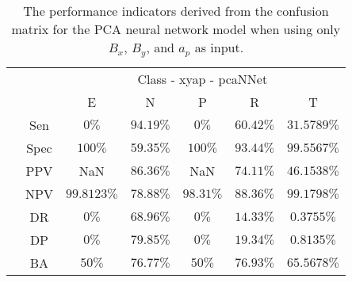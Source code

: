 \begin{table}[!ht]
	\centering
	\begin{tabular}{|c|c|c|c|c|c|c|}
		\cline{3-7}
		\multicolumn{2}{c|}{} & \multicolumn{5}{c|}{Class - xyap - pcaNNet} \\ \cline{3-7}
		\multicolumn{2}{c|}{} & E & N & P & R & T \\ \hline
		\multirow{7}{*}{\rotatebox{90}{Statistics}} & Sen & $0\%$ & $94.19\%$ & $0\%$ & $60.42\%$ & $31.5789\%$ \\ \cline{2-7}
		 & Spec & $100\%$ & $59.35\%$ & $100\%$ & $93.44\%$ & $99.5567\%$ \\ \cline{2-7}
		 & PPV & NaN & $86.36\%$ & NaN & $74.11\%$ & $46.1538\%$ \\ \cline{2-7}
		 & NPV & $99.8123\%$ & $78.88\%$ & $98.31\%$ & $88.36\%$ & $99.1798\%$ \\ \cline{2-7}
		 & DR & $0\%$ & $68.96\%$ & $0\%$ & $14.33\%$ & $0.3755\%$ \\ \cline{2-7}
		 & DP & $0\%$ & $79.85\%$ & $0\%$ & $19.34\%$ & $0.8135\%$ \\ \cline{2-7}
		 & BA & $50\%$ & $76.77\%$ & $50\%$ & $76.93\%$ & $65.5678\%$ \\ \hline
	\end{tabular}
	\caption{The performance indicators derived from the confusion matrix for the PCA neural network model when using only $B_{x}$, $B_{y}$, and $a_{p}$ as input.}
	\label{tab:cs:reverse:xyap:pcaNNet}
\end{table}
